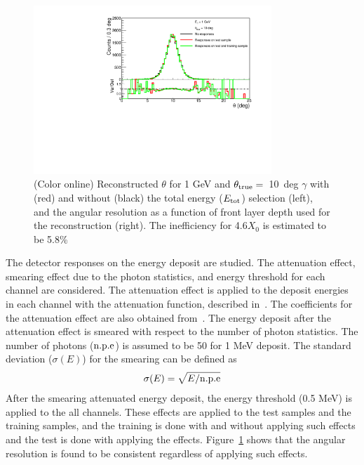 \documentclass[jkps,preprint,fleqn,showpacs,showkeys]{revtex4}
\begin{document}
\begin{figure}[!hbt]
\includegraphics[width=0.8\textwidth]{figures/Fig4_reco_ecut.pdf}
\caption{ (Color online) Reconstructed $\theta$ for 1 GeV and $\theta_{\rm{true}}=$~10~deg $\gamma$ with (red) and without (black) the total energy ($E_{\rm{tot}}$) selection (left), and the angular resolution as a function of front layer depth used for the reconstruction (right). The inefficiency for 4.6$X_{0}$ is estimated to be 5.8\%  }
\label{fig:angle_reco_ecut}
\end{figure}

The detector responses on the energy deposit are studied. The attenuation effect, smearing effect due to the photon statistics, and energy threshold for each channel are considered. The attenuation effect is applied to the deposit energies in each channel with the attenuation function, described in~\cite{Murayama:2020mcp}. The coefficients for the attenuation effect are also obtained from~\cite{Murayama:2020mcp}. The energy deposit after the attenuation effect is smeared with respect to the number of photon statistics. The number of photons ($\rm{n.p.e}$) is assumed to be 50 for 1 MeV deposit. The standard deviation ($\sigma(E)$) for the smearing can be defined as 
\begin{eqnarray}
\sigma(E) = \sqrt{E/\rm{n.p.e}}
\end{eqnarray}
After the smearing attenuated energy deposit, the energy threshold (0.5 MeV) is applied to the all channels. These effects are applied to the test samples and the training samples, and the training is done with and without applying such effects and the test is done with applying the effects. Figure~\ref{fig:angle_reco_ecut} shows that the angular resolution is found to be consistent regardless of applying such effects.
\end{document}
